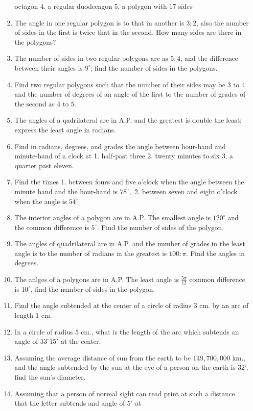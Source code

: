 \begin{enumerate}[resume]
    octagon 4. a regular duodecagon 5. a polygon with $17$ sides
\item The angle in one regular polygon is to that in another is $3:2$, also the number of sides in the first is twice that in
    the second. How many sides are there in the polygons?
\item The number of sides in two regular polygons are as $5:4$, and the difference between their angles is $9^\circ$;
    find the number of sides in the polygons.
\item Find two regular polygons such that the number of their sides may be $3$ to $4$ and the number of degrees of an
    angle of the first to the number of grades of the second as $4$ to $5.$
\item The angles of a qadrilateral are in A.P. and the greatest is double the least; express the least angle in radians.
\item Find in radians, degrees, and grades the angle between hour-hand and minute-hand of a clock at 1. half-past three 2. twenty
    minutes to six 3. a quarter past eleven.
\item Find the times 1. between fours and five o'clock when the angle between the minute hand and the hour-hand is
    $78^\circ,$ 2. between seven and eight o'clock when the angle is $54^\circ$
\item The interior angles of a polygon are in A.P. The smallest angle is $120^\circ$ and the common difference is
    $5^\circ$. Find the number of sides of the polygon.
\item The angles of quadrilateral are in A.P. and the number of grades in the least angle is to the number of radians in the greatest is
    $100:\pi$. Find the angles in degrees.
\item The anlges of a polygons are in A.P. The least angle is $\frac{5\pi}{12}$ common difference is $10^\circ$, find the
    number of sides in the polygon.
\item Find the angle subtended at the center of a circle of radius $3$ cm. by an arc of length $1$ cm.
\item In a circle of radius $5$ cm., what is the length of the arc which subtends an angle of $33^\circ15'$ at the center.
\item Assuming the average distance of sun from the earth to be $149,700,000$ km., and the angle subtended by the sun at the
    eye of a person on the earth is $32'$, find the sun's diameter.
\item Assuming that a person of normal sight can read print at such a distance that the letter subtends and angle of $5'$ at

\end{enumerate}
